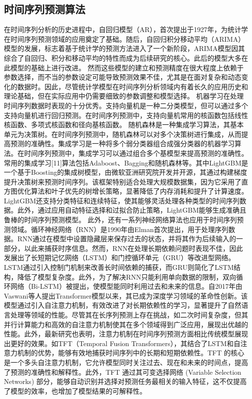 \subsection{时间序列预测算法}
在时间序列分析的历史进程中，自回归模型（AR），首次提出于1927年，为统计学在时间序列预测领域的应用奠定了基础。随后，自回归积分移动平均（ARIMA）模型的发展，标志着基于统计学的预测方法进入了一个新阶段，ARIMA模型因其综合了自回归、积分和移动平均的特性而成为后续研究的核心。此后的模型大多在此模型的基础上进行改进。
然而这些模型的建立和预测精度在很大程度上依赖于参数选择，而不当的参数设定可能导致预测效果不佳，尤其是在面对复杂和动态变化的数据时。因此，尽管统计学模型在时间序列分析领域内有着长久的应用历史和理论基础，但在实际应用中仍需要细致的参数调整和模型选择。
机器学习在处理时间序列数据时表现的十分优秀。支持向量机是一种二分类模型，但可以通过多个支持向量机进行回归预测。在时间序列预测中，支持向量机常用的核函数包括线性核函数、多项式核函数和径向基核函数。
随机森林是一种集成学习算法，其基本单元为决策树。在时间序列预测中，随机森林可以对多个决策树进行集成，从而提高预测的准确性。集成学习是一种将多个弱分类器组合成强分类器的机器学习算法。在时间序列预测中，集成学习可以通过组合多个基模型来提高预测的准确性。常用的集成学习[11]算法包括Adaboost、Bagging和随机森林等。其中LightGBM是一个基于Boosting的集成树模型，由微软亚洲研究院开发并开源，其通过构建梯度提升决策树来预测时间序列。该框架特别适合处理大规模数据集，因为它采用了直方图优化算法和叶子优先的树增长策略，显著降低了内存消耗和提升了计算速度。LightGBM还支持分类特征和连续特征，使其能够灵活处理各种类型的时间序列数据。此外，通过应用自动特征选择和过拟合防止策略，LightGBM能够生成准确且鲁棒的时间序列预测模型。
此外，还有一系列神经网络算法也应用于时间序列预测领域。循环神经网络（RNN）是1990年由Elman首次提出，用于处理序列数据。RNN通过在模型中设置隐藏层来保存过去的状态，并将其作为后续输入的一部分，以此来捕获时序信息。然而，RNN在处理长期依赖问题时表现不佳，因此发展出了长短期记忆网络（LSTM）和门控循环单元（GRU）等改进型网络。LSTM通过引入控制门机制来改善长时间依赖的捕获，而GRU则简化了LSTM结构，降低了模型复杂度。此外，为了解决RNN只能利用单向数据的限制，双向循环网络（Bi-LSTM）被提出，使模型能同时利用过去和未来的信息。自2017年由Vaswani等人提出Transformer模型以来，其已成为深度学习领域的革命性创新。该模型通过引入自注意力机制，有效改进了对长期依赖性的学习，显著提升了自然语言处理等领域的性能。尽管其在长序列预测上存在挑战，如二次时间复杂度，但其并行计算能力和高效的自注意力机制使其在多个领域得到广泛应用，展现出优越的性能。此外，最新研究也表明，注意力机制在时间序列预测方面相比传统模型展现出更好的效果。如TFT（Temporal Fusion Transformers），其结合了LSTM和自注意力机制的优势，能够有效地捕获时间序列中的长期和短期依赖性。TFT 的核心是一个多头自注意力机制，它允许模型同时关注过去、现在和未来的时间点，提高了预测的准确性和解释性。此外，TFT 通过其可变选择网络 (Variable Selection Networks) 部分，能够自动识别并选择对预测任务最相关的输入特征，这不仅提高了模型的效率，也增加了模型结果的可解释性。
